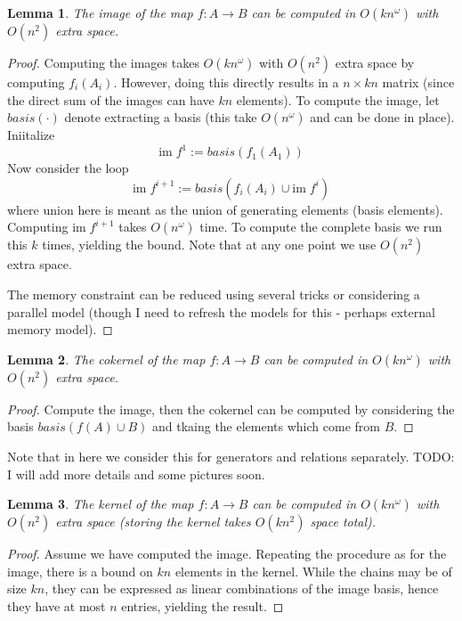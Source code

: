 \documentclass{amsart}
\newtheorem{lemma}{Lemma}[theorem]
\newcommand{\im}{\mathrm{im\;}}
\begin{document}
\begin{lemma}
The image of the map $f: A\rightarrow B$ can be computed in  $O(kn^\omega)$ with $O(n^2)$ extra space. 
\end{lemma}
\begin{proof}
	Computing the images takes  $O(kn^\omega)$ with $O(n^2)$ extra space by computing $f_i(A_i)$. However, doing this directly results in a $n \times kn$ matrix (since the direct sum of the images can have $kn$ elements). To compute the image,  let 
	$basis(\cdot)$ denote extracting a basis (this take $O(n^\omega)$ and can be done in place). 
	Iniitalize 
	$$\im f^{1} := basis(f_1(A_1)) $$ 
	Now consider the loop
	$$\im f^{i+1} := basis(f_i(A_i)\cup \im f^{i}) $$ 
	where union here is meant as the union of generating elements (basis elements).
	Computing $\im f^{i+1}$ takes  $O(n^\omega)$ time. To compute the complete basis we run this $k$ times, yielding the bound.  Note that at any one point we use $O(n^2)$ extra space. 

	The memory constraint can be reduced using several tricks or considering a parallel model (though I need to refresh the models for this - perhaps external memory model).
\end{proof}


\begin{lemma}
The cokernel of the map $f: A\rightarrow B$ can be computed in $O(kn^\omega)$ with $O(n^2)$ extra space. 
\end{lemma}
\begin{proof}
	Compute the image, then the cokernel can be computed by considering  the basis  $basis(f(A)\cup B  )  $ and tkaing the elements which come from $B$.
\end{proof}
Note that in here we consider this for generators and relations separately.  TODO: I will add more details and some pictures soon.


\begin{lemma}
	The kernel of the map $f: A\rightarrow B$ can be computed in $O(kn^\omega)$ with $O(n^2)$ extra space (storing the kernel takes $O(kn^2)$ space total).
\end{lemma}
\begin{proof}
Assume we have computed the image. Repeating the procedure as for the image, there is a bound on $kn$ elements in the kernel. While the chains may be of size $kn$, they can be expressed as linear combinations of the image basis, hence they have at most $n$ entries, yielding the result.
\end{proof}
\end{document}
